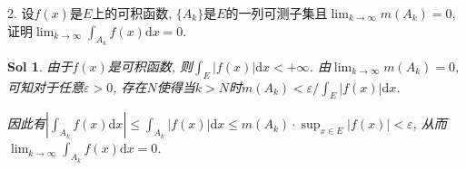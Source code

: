 \documentclass[UTF8]{article}
\newtheorem{solution}{Sol}
\begin{document}
  2. 设$f(x)$是$E$上的可积函数, $\{A_k\}$是$E$的一列可测子集且$\lim_{k \to \infty}m(A_k)=0$, 证明$\lim_{k \to \infty}\int_{A_k}f(x)\mathrm{d}x=0$.\par
    
  \begin{solution}
    由于$f(x)$是可积函数, 则$\int_{E}|f(x)|\mathrm{d}x<+\infty$. 由$\lim_{k \to \infty}m(A_k)=0$, 可知对于任意$\varepsilon >0$, 存在$N$使得当$k>N$时$m(A_k)<\varepsilon/\int_{E}|f(x)|\mathrm{d}x$.\par
    因此有$\left|\int_{A_k}f(x)\mathrm{d}x\right|\leqslant \int_{A_k}|f(x)|\mathrm{d}x\leqslant m(A_k)\cdot \sup_{x\in E}|f(x)|<\varepsilon$, 从而$\lim_{k \to \infty}\int_{A_k}f(x)\mathrm{d}x=0$.\par
  \end{solution}
\end{document}

